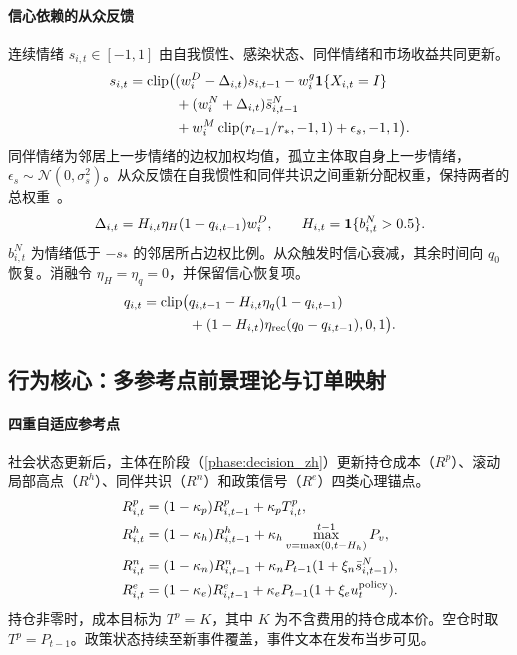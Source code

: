 \paragraph{信心依赖的从众反馈} 连续情绪 $s_{i,t}\in[-1,1]$ 由自我惯性、感染状态、同伴情绪和市场收益共同更新。
\begin{equation}
\begin{split}s_{i,t}=\operatorname{clip}\bigl(&(w_i^D-\Delta_{i,t})s_{i,t-1}-w_i^g\mathbf{1}\{X_{i,t}=I\}\\&+(w_i^N+\Delta_{i,t})\bar s^N_{i,t-1}\\&+w_i^M\operatorname{clip}(r_{t-1}/r_*,-1,1)+\epsilon_s,-1,1\bigr).\end{split}
  \label{eq:sentiment_update_zh}
\end{equation}
同伴情绪为邻居上一步情绪的边权加权均值，孤立主体取自身上一步情绪，$\epsilon_s\sim\mathcal N(0,\sigma_s^2)$。从众反馈在自我惯性和同伴共识之间重新分配权重，保持两者的总权重~\cite{deutsch1955study}。
\begin{equation}
\Delta_{i,t}=H_{i,t}\eta_H(1-q_{i,t-1})w_i^D,\qquad H_{i,t}=\mathbf{1}\{b^N_{i,t}>0.5\}.
  \label{eq:herding_shift_zh}
\end{equation}
$b^N_{i,t}$ 为情绪低于 $-s_*$ 的邻居所占边权比例。从众触发时信心衰减，其余时间向 $q_0$ 恢复。消融令 $\eta_H=\eta_q=0$，并保留信心恢复项。
\begin{equation}
\begin{split}q_{i,t}=\operatorname{clip}\bigl(&q_{i,t-1}-H_{i,t}\eta_q(1-q_{i,t-1})\\&+(1-H_{i,t})\eta_{\rm rec}(q_0-q_{i,t-1}),0,1\bigr).\end{split}
  \label{eq:confidence_update_zh}
\end{equation}

\subsection{行为核心：多参考点前景理论与订单映射}
\label{sec:method:behavior_zh}

\paragraph{四重自适应参考点} 社会状态更新后，主体在阶段（\ref{phase:decision_zh}）更新持仓成本（$R^p$）、滚动局部高点（$R^h$）、同伴共识（$R^n$）和政策信号（$R^e$）四类心理锚点。
\begin{align}
 R^p_{i,t}&=(1-\kappa_p)R^p_{i,t-1}+\kappa_p T^p_{i,t},\label{eq:ref_p_zh}\\
 R^h_{i,t}&=(1-\kappa_h)R^h_{i,t-1}+\kappa_h \max_{v=\max(0,t-H_h)}^{t-1}P_v,\label{eq:ref_h_zh}\\
 R^n_{i,t}&=(1-\kappa_n)R^n_{i,t-1}+\kappa_nP_{t-1}(1+\xi_n\bar s^N_{i,t-1}),\label{eq:ref_n_zh}\\
 R^e_{i,t}&=(1-\kappa_e)R^e_{i,t-1}+\kappa_eP_{t-1}(1+\xi_e u_t^{\rm policy}).\label{eq:ref_e_zh}
\end{align}
持仓非零时，成本目标为 $T^p=K$，其中 $K$ 为不含费用的持仓成本价。空仓时取 $T^p=P_{t-1}$。政策状态持续至新事件覆盖，事件文本在发布当步可见。

